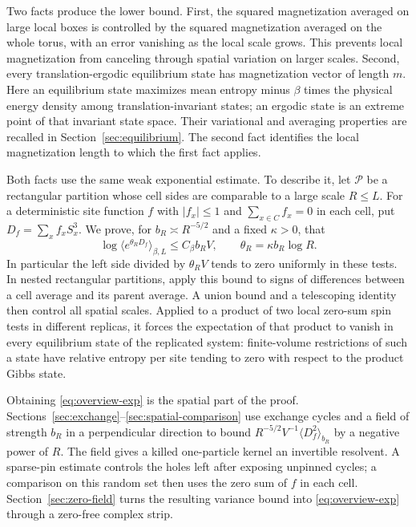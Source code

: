 Two facts produce the lower bound. First, the squared magnetization
averaged on large local boxes is controlled by the squared magnetization
averaged on the whole torus, with an error vanishing as the local scale
grows. This prevents local magnetization from canceling through spatial
variation on larger scales. Second, every translation-ergodic equilibrium
state has magnetization vector of length $m$. Here an equilibrium state
maximizes mean entropy minus $\beta$ times the physical energy density
among translation-invariant
states; an ergodic state is an extreme point of that invariant state
space. Their variational and averaging properties are recalled in
Section~\ref{sec:equilibrium}. The second fact identifies the local
magnetization length to which the first fact applies.

Both facts use the same weak exponential estimate. To describe it, let
$\mathcal P$ be a rectangular partition whose cell sides are comparable
to a large scale $R\le L$. For a deterministic site function $f$ with
$|f_x|\le1$ and $\sum_{x\in C}f_x=0$ in each cell, put
$D_f=\sum_xf_xS_x^3$. We prove, for
$b_R\asymp R^{-5/2}$ and a fixed $\kappa>0$, that
\begin{equation}\label{eq:overview-exp}
 \log\langle e^{\theta_R D_f}\rangle_{\beta,L}
       \le C_\beta b_R V,
 \qquad \theta_R=\kappa b_R\log R.
\end{equation}
In particular the left side divided by $\theta_R V$ tends to zero
uniformly in these tests. In nested rectangular partitions, apply this
bound to signs of differences between a cell average and its parent
average. A union bound and a telescoping identity then control all spatial
scales. Applied to a product of two local zero-sum spin tests in
different replicas, it forces the expectation of that product to vanish
in every equilibrium state of the replicated system: finite-volume
restrictions of such a state have relative entropy per site tending to
zero with respect to the product Gibbs state.

Obtaining \eqref{eq:overview-exp} is the spatial part of the proof.
Sections~\ref{sec:exchange}--\ref{sec:spatial-comparison} use exchange
cycles and a field of strength $b_R$ in a perpendicular direction to bound
$R^{-5/2}V^{-1}\langle D_f^2\rangle_{b_R}$ by a negative power of $R$.
The field gives a killed one-particle kernel an invertible resolvent.
A sparse-pin estimate controls the holes left after exposing unpinned
cycles; a comparison on this random set then uses the zero sum of $f$ in
each cell. Section~\ref{sec:zero-field} turns the resulting variance
bound into \eqref{eq:overview-exp} through a zero-free complex strip.

